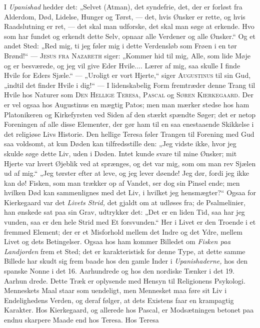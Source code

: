 \documentclass[12pt,a4paper,openany]{book}
\newcommand{\opage}[1]{\marginnote{\footnotesize\textit{[#1]}}}
\begin{document}
I \textit{Upanishad} hedder det: „Selvet (Atman), det syndefrie, det,
der er forløst fra Alderdom, Død, Lidelse, Hunger og Tørst, --- det,
hvis Ønsker er rette, og hvis Raadslutning er ret, --- det skal man
udforske, det skal man søge at erkende. Hvo som har fundet og erkendt
dette Selv, opnaar alle Verdener og alle Ønsker.“ Og et andet Sted: „Red
mig, ti jeg føler mig i dette Verdensløb som Frøen i en tør Brønd!“ ---
\textsc{Jesus fra Nazareth} siger: „Kommer hid til mig, Alle, som lide
Møje og er besværede, og jeg vil give Eder Hvile.... Lærer af mig, saa
skulle I finde Hvile for Eders Sjæle.“ --- „Uroligt er vort Hjerte,“
siger \textsc{Augustinus} til sin Gud, „indtil det finder Hvile i dig!“
--- I lidenskabelig Form fremtræder denne Trang til Hvile hos Naturer
som \textsc{Den Hellige Teresa, Pascal} og \textsc{Søren Kierkegaard.}
Der er vel ogsaa hos Augustinus en mægtig Patos; men man mærker stedse
hos ham Platonikeren og Kirkefyrsten ved Siden af den stærkt spændte
Søger; det er netop Foreningen af alle disse Elementer, der gør ham til
en saa enestaaende Skikkelse i det religiøse Livs Historie. Den hellige
Teresa føler Trangen til Forening med Gud saa voldsomt, at kun Døden kan
tilfredsstille den: „Jeg vidste ikke, hvor jeg skulde søge dette Liv,
uden i Døden. Intet kunde svare til mine Ønsker; mit Hjerte var hvert
Øjeblik ved at sprænges, og det var mig, som om man rev Sjælen ud af
mig.“ „Jeg tørster efter at leve, og jeg lever døende! Jeg dør, fordi
jeg ikke kan dø! Fisken, som man trækker op af Vandet, ser dog sin
Pinsel ende; men hvilken Død kan sammenlignes med det Liv, i hvilket jeg
hensmægter?“ Ogsaa for Kierkegaard var det \textit{Livets Strid,} det
gjaldt om at udløses fra; de Psalmelinier, han ønskede sat paa sin Grav,
udtrykker det: „Det er en liden Tid, saa har jeg vunden, saa er den hele
Strid med Et forsvunden.“ Her i Livet er den Troende i et fremmed
Element; der er et Misforhold mellem det Indre og det Ydre, mellem Livet
og dets Betingelser. Ogsaa hos ham kommer Billedet om \textit{Fisken paa
Landjorden} frem et Sted; det er karakteristisk for denne Type, at dette
samme Billede har skudt sig frem baade hos den gamle Inder i
\textit{Upanishaderne,} hos den spanske Nonne i det 16. Aarhundrede og
hos den nordiske Tænker i det 19. Aarhun%
\opage{74}drede. Dette Træk er oplysende med Hensyn til Religionens
Psykologi. Menneskets Maal staar som uendeligt, men Mennesket maa føre
sit Liv i Endelighedens Verden, og deraf følger, at dets Existens faar
en krampagtig Karakter. Hos Kierkegaard, og allerede hos Pascal, er
Modsætningen betonet paa endnu skarpere Maade end hos Teresa. Hos Teresa
\end{document}
